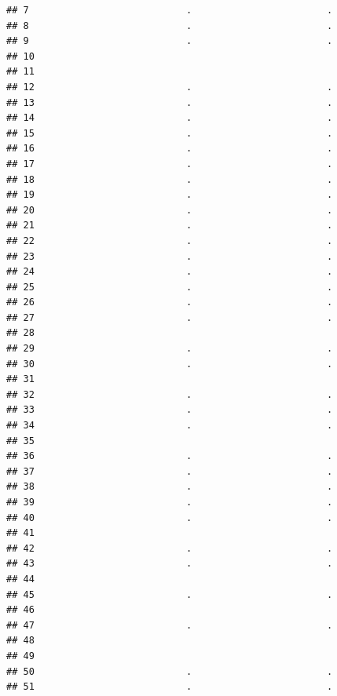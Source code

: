 \documentclass[
]{article}
\begin{document}
\begin{verbatim}
## 7                            .                        .
## 8                            .                        .
## 9                            .                        .
## 10                                                     
## 11                                                     
## 12                           .                        .
## 13                           .                        .
## 14                           .                        .
## 15                           .                        .
## 16                           .                        .
## 17                           .                        .
## 18                           .                        .
## 19                           .                        .
## 20                           .                        .
## 21                           .                        .
## 22                           .                        .
## 23                           .                        .
## 24                           .                        .
## 25                           .                        .
## 26                           .                        .
## 27                           .                        .
## 28                                                     
## 29                           .                        .
## 30                           .                        .
## 31                                                     
## 32                           .                        .
## 33                           .                        .
## 34                           .                        .
## 35                                                     
## 36                           .                        .
## 37                           .                        .
## 38                           .                        .
## 39                           .                        .
## 40                           .                        .
## 41                                                     
## 42                           .                        .
## 43                           .                        .
## 44                                                     
## 45                           .                        .
## 46                                                     
## 47                           .                        .
## 48                                                     
## 49                                                     
## 50                           .                        .
## 51                           .                        .

\end{verbatim}
\end{document}
